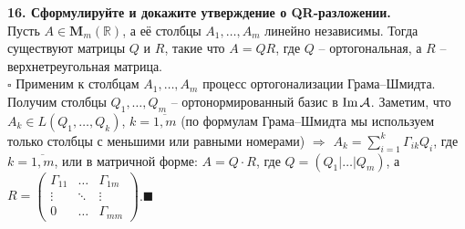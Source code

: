 \documentclass[11pt,a4paper]{article}
\newcommand{\R}{\mathbb{R}}
\newcommand{\A}{\mathcal{A}}
\renewcommand{\Im}[1]{\mathrm{Im}\hspace{0.5mm}#1}
\newcommand{\proof}{$\square$ }
\newcommand{\qed}{\hfill$\blacksquare$}
\begin{document}
\textbf{16. Сформулируйте и докажите утверждение о QR-разложении.\\}
Пусть $A \in \mathbf{M}_m (\R)$, а её столбцы $A_1, \hdots, A_m$ линейно независимы. Тогда существуют матрицы $Q$ и $R$, такие что $A = QR$, где $Q$ -- ортогональная, а $R$ -- верхнетреугольная матрица.\\
\proof Применим к столбцам $A_1, \hdots, A_m$ процесс ортогонализации Грама--Шмидта. Получим столбцы $Q_1, \hdots, Q_m$ -- ортонормированный базис в $\Im{\A}$. Заметим, что $A_k \in L(Q_1, \hdots, Q_k)$, $k = \overline{1, m}$ (по формулам Грама--Шмидта мы используем только столбцы с меньшими или равными номерами) $\Rightarrow$ $A_k = \sum_{i = 1}^k \Gamma_{ik} Q_i$, где $k = \overline{1, m}$, или в матричной форме: $A = Q \cdot R$, где $Q = (Q_1 | \hdots | Q_m)$, а $R = \left( \begin{matrix}
\Gamma_{11} & \hdots & \Gamma_{1m} \\
\vdots & \ddots & \vdots \\
0 & \hdots & \Gamma_{mm}
\end{matrix} \right)$.\qed
\end{document}
